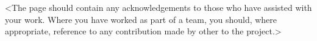 <The page should contain any acknowledgements to those who have assisted with your work.
Where you have worked as part of a team, you should, where appropriate, reference to any contribution made by other to the project.>


